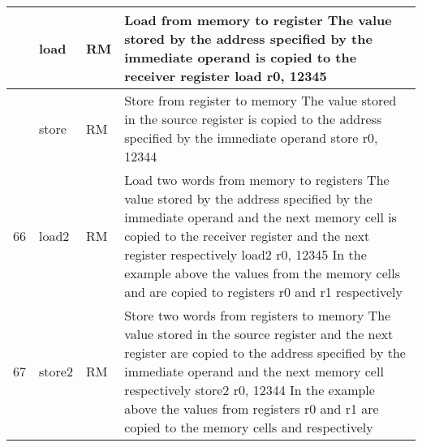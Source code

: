 \documentclass{article}
\newcommand{\St}[1]{{\fontfamily{qcr}\selectfont #1}}
\newcommand{\Ss}[1]{{\fontfamily{cmss}\selectfont #1}}
\begin{document}
{
\renewcommand{\arraystretch}{1.4}
\begin{table*}[h!]
\centering
\vspace{2mm}
\centering
\begin{tabular}{| >{\centering\arraybackslash} m{1cm} | >{\centering\arraybackslash} m{1.4cm} | >{\centering\arraybackslash} m{1.2cm} | m{11.6cm} |}

 \hline
 
 64 & \St{load} & \Ss{RM} &
 
 Load from memory to register \newline
 The value stored by the address specified by the immediate operand \newline
 is copied to the receiver register \newline
 \St{load r0, 12345} \\
 
 \hline
 
 65 & \St{store} & \Ss{RM} &
 
 Store from register to memory \newline
 The value stored in the source register is copied to the address \newline
 specified by the immediate operand \newline
 \St{store r0, 12344} \\
 
 \hline
 
 66 & \St{load2} & \Ss{RM} &
 
 Load two words from memory to registers \newline
 The value stored by the address specified by the immediate operand and \newline
 the next memory cell is copied to the receiver register and the next register \newline
 respectively \newline
 \St{load2 r0, 12345} \newline
 In the example above the values from the memory cells \St{12345} and \St{12346} \newline
 are copied to registers \St{r0} and \St{r1} respectively \\
 
 \hline
 
 67 & \St{store2} & \Ss{RM} &
 
 Store two words from registers to memory \newline
 The value stored in the source register and the next register are copied to \newline
 the address specified by the immediate operand and the next memory cell \newline
 respectively \newline
 \St{store2 r0, 12344} \newline
 In the example above the values from registers \St{r0} and \St{r1} are copied to \newline
 the memory cells \St{12344} and \St{12345} respectively \\
 

\end{tabular}
\end{table*}}
\end{document}

